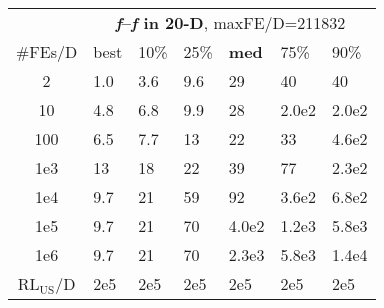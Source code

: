 \begin{tabular}{c|llllll}
 & \multicolumn{6}{|c}{\textbf{\textit{f}\raisebox{-0.35ex}{1}--\textit{f}\raisebox{-0.35ex}{23} in 20-D}, maxFE/D=211832}\\
\#FEs/D & best & 10\% & 25\% & \textbf{med} & 75\% & 90\%\\
2 & \hspace*{1ex}1.0 & \hspace*{1ex}3.6 & \hspace*{1ex}9.6 & 29 & 40 & 40\\
10 & \hspace*{1ex}4.8 & \hspace*{1ex}6.8 & \hspace*{1ex}9.9 & 28 & 2.0e2 & 2.0e2\\
100 & \hspace*{1ex}6.5 & \hspace*{1ex}7.7 & 13 & 22 & 33 & 4.6e2\\
1e3 & 13 & 18 & 22 & 39 & 77 & 2.3e2\\
1e4 & \hspace*{1ex}9.7 & 21 & 59 & 92 & 3.6e2 & 6.8e2\\
1e5 & \hspace*{1ex}9.7 & 21 & 70 & 4.0e2 & 1.2e3 & 5.8e3\\
1e6 & \hspace*{1ex}9.7 & 21 & 70 & 2.3e3 & 5.8e3 & 1.4e4\\
$\text{RL}_{\text{US}}$/D & 2e5 & 2e5 & 2e5 & 2e5 & 2e5 & 2e5
\end{tabular}
